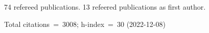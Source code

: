 74 refereed publications. 13 refeered publications as first author.

Total citations~=~3008; h-index~=~30 (2022-12-08)